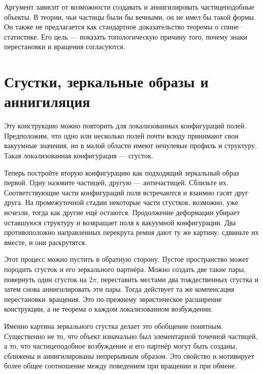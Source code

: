 Аргумент зависит от возможности создавать и аннигилировать частицеподобные объекты. В теории, чьи частицы были бы вечными, он не имел бы такой формы. Он также не предлагается как стандартное доказательство теоремы о спине--статистике. Его цель — показать топологическую причину того, почему знаки перестановки и вращения согласуются.

\section{Сгустки, зеркальные образы и аннигиляция}

Эту конструкцию можно повторить для локализованных конфигураций полей. Предположим, что одно или несколько полей почти всюду принимают свои вакуумные значения, но в малой области имеют ненулевые профиль и структуру. Такая локализованная конфигурация — сгусток.

Теперь постройте вторую конфигурацию как подходящий зеркальный образ первой. Одну назовите частицей, другую — античастицей. Сблизьте их. Соответствующие части конфигураций поля встречаются и взаимно гасят друг друга. На промежуточной стадии некоторые части сгустков, возможно, уже исчезли, тогда как другие ещё остаются. Продолжение деформации убирает оставшуюся структуру и возвращает поля к вакуумной конфигурации. Два противоположно направленных перекрута ремня дают ту же картину: сдвиньте их вместе, и они раскрутятся.

Этот процесс можно пустить в обратную сторону. Пустое пространство может породить сгусток и его зеркального партнёра. Можно создать две такие пары, повернуть один сгусток на \(2\pi\), переставить местами два тождественных сгустка и затем снова аннигилировать эти пары. Тогда действует та же компенсация перестановки--вращения. Это по-прежнему эвристическое расширение конструкции, а не теорема о каждом локализованном возбуждении.

\begin{classroomqa}
\end{classroomqa}

Именно картина зеркального сгустка делает это обобщение понятным. Существенно не то, что объект изначально был элементарной точечной частицей, а то, что частицеподобное возбуждение и его партнёр могут быть созданы, сближены и аннигилированы непрерывным образом. Это свойство и мотивирует более общее соотношение между поведением при вращении и при обмене.


